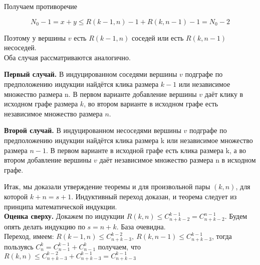 Получаем противоречие

$$N_0 - 1 = x + y \leq R(k - 1, n) - 1 + R(k, n - 1) - 1 = N_0 - 2$$

Поэтому у вершины $v$ есть $R(k - 1, n)$ соседей или есть $R(k, n - 1)$ несоседей. \\

Оба случая рассматриваются аналогично.

\textbf{Первый случай.} В индуцированном соседями вершины $v$ подграфе по предположению индукции найдётся клика размера $k - 1$ или независимое множество размера n. В первом варианте добавление вершины $v$ даёт клику в исходном графе размера $k$, во втором варианте в исходном графе есть независимое множество размера $n$.

\textbf{Второй случай.} В индуцированном несоседями вершины $v$ подграфе по предположению индукции найдётся клика размера k или независимое множество размера $n - 1$. В первом варианте в исходной графе есть клика размера k, а во втором добавление вершины $v$ даёт независимое множество размера n в исходном графе.

Итак, мы доказали утверждение теоремы и для произвольной пары $(k, n)$, для которой $k + n = s + 1$. Индуктивный переход доказан, и теорема следует из принципа математической индукции. \\

\textbf{Оценка сверху.} Докажем по индукции $R(k, n) \leq C^{k - 1}_{n + k - 2} = C^{n - 1}_{n + k - 2}$. Будем опять делать индукцию по $s = n + k$. База очевидна. \\

Переход, имеем: $R(k - 1, n) \leq C^{k - 2}_{n + k - 3},\ R(k, n - 1) \leq C^{k - 1}_{n + k - 3}$, тогда пользуясь $C_{n}^{k} = C_{n - 1}^{k - 1} + C_{n - 1}^{k}$ получаем, что $R(k, n) \leq C^{k - 2}_{n + k - 3} + 
C^{k - 1}_{n + k - 3} = C^{k - 1}_{n + k - 3}$